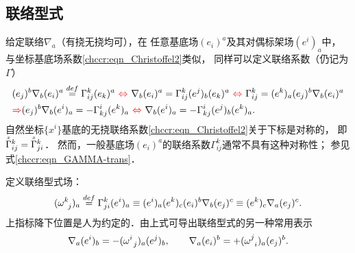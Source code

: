 \subsection{联络型式}\label{chccr:sec_connectionForm}
给定联络$\nabla _a$（有挠无挠均可），在
任意基底场$(e_i)^a$及其对偶标架场$(e^i)_a$中，
与坐标基底场系数\eqref{chccr:eqn_Christoffel2}类似，
同样可以定义联络系数（仍记为$\Gamma$）
    \begin{align}
        &(e_j)^b \nabla _b (e_i)^a  \overset{def}{=} \Gamma^{k}_{ij} (e_k)^a
        {\ \color{red} \Leftrightarrow \ }
        \nabla _b (e_i)^a = \Gamma^{k}_{ij} (e^j)_b (e_k)^a
        {\ \color{red} \Leftrightarrow \ }
        \Gamma^{k}_{ij}  =  (e^k)_a (e_j)^b \nabla _b (e_i)^a \notag \\
        &{\color{red} \Rightarrow }
        (e_j)^b \nabla _b (e^i)_a  = -\Gamma^{i}_{kj} (e^k)_a
        {\ \color{red} \Leftrightarrow \ }
        \nabla _b (e^i)_a = -\Gamma^{i}_{kj}(e^j)_b  (e^k)_a  . \label{chccr:eqn_concoef}
    \end{align}
自然坐标$\{x^i\}$基底的无挠联络系数\eqref{chccr:eqn_Christoffel2}关于下标是对称的，
即$\oversetmy{x}{\Gamma}^{k}_{ij}=\oversetmy{x}{\Gamma}^{k}_{ji}$．
然而，一般基底场$(e_i)^a$的联络系数$\Gamma^{k}_{ij}$通常不具有这种对称性；
参见式\eqref{chccr:eqn_GAMMA-trans}．


定义{\heiti 联络型式场}：
\begin{equation}\label{chccr:def_1form}
    (\omega_{\hphantom{a} j}^{k})_a \overset{def}{=} \Gamma_{ji}^k (e^i)_a
    \equiv (e^i)_a (e^k)_c (e_i)^b \nabla _b (e_j)^c
    \equiv (e^k)_c \nabla _a (e_j)^c .
\end{equation}
上指标降下位置是人为约定的．由上式可导出联络型式的另一种常用表示
\begin{equation}\label{chccr:eqn_D-omega-form}
    \nabla _a (e^i)_b= - (\omega_{\hphantom{a} j}^{i})_a (e^j)_b ,\qquad
    \nabla _a (e_i)^b= + (\omega_{\hphantom{a} i}^{j})_a (e_j)^b .
\end{equation}


